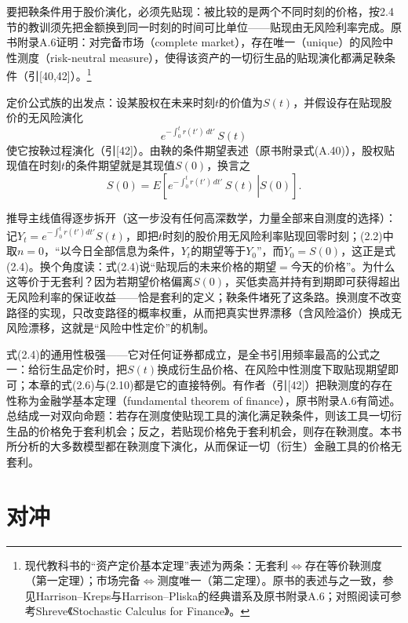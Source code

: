 要把鞅条件用于股价演化，必须先贴现：被比较的是两个不同时刻的价格，按2.4节的教训须先把金额换到同一时刻的时间可比单位——贴现由无风险利率完成。原书附录A.6证明：对完备市场（complete market），存在唯一（unique）的风险中性测度（risk-neutral measure），使得该资产的一切衍生品的贴现演化都满足鞅条件（引[40,42]）。\footnote{现代教科书的“资产定价基本定理”表述为两条：无套利$\Leftrightarrow$存在等价鞅测度（第一定理）；市场完备$\Leftrightarrow$测度唯一（第二定理）。原书的表述与之一致，参见Harrison--Kreps与Harrison--Pliska的经典谱系及原书附录A.6；对照阅读可参考Shreve《Stochastic Calculus for Finance》。}

定价公式族的出发点：设某股权在未来时刻$t$的价值为$S(t)$，并假设存在贴现股价的无风险演化
\begin{equation*}
e^{-\int_0^t r(t')\,dt'}\,S(t)
\tag{2.3}
\end{equation*}
使它按鞅过程演化（引[42]）。由鞅的条件期望表述（原书附录式(A.40)），股权贴现值在时刻$t$的条件期望就是其现值$S(0)$，换言之
\begin{equation*}
S(0)=E\!\left[\left.e^{-\int_0^t r(t')\,dt'}\,S(t)\,\right|S(0)\right].
\tag{2.4}
\end{equation*}

推导主线值得逐步拆开（这一步没有任何高深数学，力量全部来自测度的选择）：记$Y_t=e^{-\int_0^t r(t')dt'}S(t)$，即把$t$时刻的股价用无风险利率贴现回零时刻；(2.2)中取$n=0$，“以今日全部信息为条件，$Y_t$的期望等于$Y_0$”，而$Y_0=S(0)$，这正是式(2.4)。换个角度读：式(2.4)说“贴现后的未来价格的期望$=$今天的价格”。为什么这等价于无套利？因为若期望价格偏离$S(0)$，买低卖高并持有到期即可获得超出无风险利率的保证收益——恰是套利的定义；鞅条件堵死了这条路。换测度不改变路径的实现，只改变路径的概率权重，从而把真实世界漂移（含风险溢价）换成无风险漂移，这就是“风险中性定价”的机制。

式(2.4)的通用性极强——它对任何证券都成立，是全书引用频率最高的公式之一：给衍生品定价时，把$S(t)$换成衍生品价格、在风险中性测度下取贴现期望即可；本章的式(2.6)与(2.10)都是它的直接特例。有作者（引[42]）把鞅测度的存在性称为金融学基本定理（fundamental theorem of finance），原书附录A.6有简述。总结成一对双向命题：若存在测度使贴现工具的演化满足鞅条件，则该工具一切衍生品的价格免于套利机会；反之，若贴现价格免于套利机会，则存在鞅测度。本书所分析的大多数模型都在鞅测度下演化，从而保证一切（衍生）金融工具的价格无套利。

\section{对冲}

